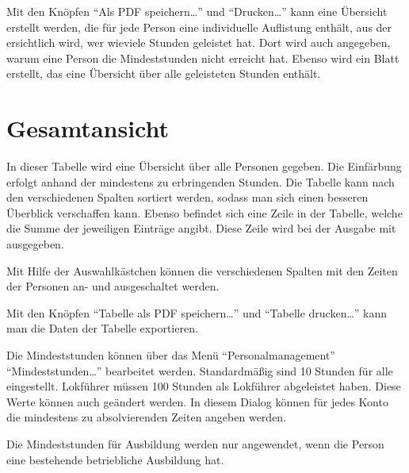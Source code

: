 Mit den Knöpfen ``Als PDF speichern\dots'' und ``Drucken\dots'' kann eine Übersicht erstellt werden, die für jede Person eine individuelle Auflistung enthält, aus der ersichtlich wird, wer wieviele Stunden geleistet hat.
Dort wird auch angegeben, warum eine Person die Mindeststunden nicht erreicht hat.
Ebenso wird ein Blatt erstellt, das eine Übersicht über alle geleisteten Stunden enthält.



\section{Gesamtansicht}
In dieser Tabelle wird eine Übersicht über alle Personen gegeben.
Die Einfärbung erfolgt anhand der mindestens zu erbringenden Stunden.
Die Tabelle kann nach den verschiedenen Spalten sortiert werden, sodass man sich einen besseren Überblick verschaffen kann.
Ebenso befindet sich eine Zeile in der Tabelle, welche die Summe der jeweiligen Einträge angibt.
Diese Zeile wird bei der Ausgabe mit ausgegeben.

Mit Hilfe der Auswahlkästchen können die verschiedenen Spalten mit den Zeiten der Personen an- und ausgeschaltet werden.

Mit den Knöpfen ``Tabelle als PDF speichern\dots'' und ``Tabelle drucken\dots'' kann man die Daten der Tabelle exportieren.

Die Mindeststunden können über das Menü ``Personalmanagement'' \nach ``Mindeststunden\dots'' bearbeitet werden.
Standardmäßig sind 10 Stunden für alle eingestellt.
Lokführer müssen 100 Stunden als Lokführer abgeleistet haben.
Diese Werte können auch geändert werden.
In diesem Dialog können für jedes Konto die mindestens zu absolvierenden Zeiten angeben werden.

Die Mindeststunden für Ausbildung werden nur angewendet, wenn die Person eine bestehende betriebliche Ausbildung hat.
